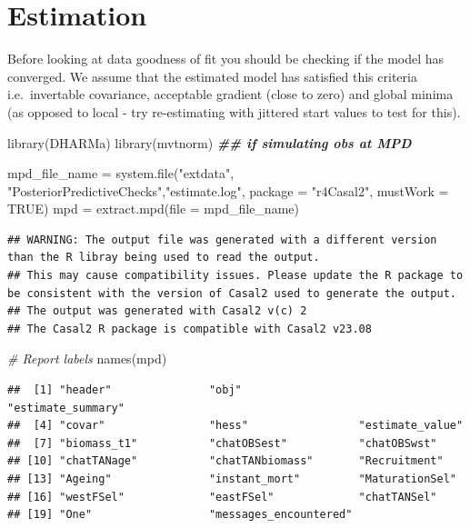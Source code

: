 \documentclass[
]{book}
\newenvironment{Shaded}{\begin{snugshade}}{\end{snugshade}}
\newcommand{\AttributeTok}[1]{\textcolor[rgb]{0.77,0.63,0.00}{#1}}
\newcommand{\CommentTok}[1]{\textcolor[rgb]{0.56,0.35,0.01}{\textit{#1}}}
\newcommand{\ConstantTok}[1]{\textcolor[rgb]{0.00,0.00,0.00}{#1}}
\newcommand{\DocumentationTok}[1]{\textcolor[rgb]{0.56,0.35,0.01}{\textbf{\textit{#1}}}}
\newcommand{\FunctionTok}[1]{\textcolor[rgb]{0.00,0.00,0.00}{#1}}
\newcommand{\NormalTok}[1]{#1}
\newcommand{\OtherTok}[1]{\textcolor[rgb]{0.56,0.35,0.01}{#1}}
\newcommand{\StringTok}[1]{\textcolor[rgb]{0.31,0.60,0.02}{#1}}
\begin{document}
\hypertarget{estimation}{%
\section{Estimation}\label{estimation}}

Before looking at data goodness of fit you should be checking if the model has converged. We assume that the estimated model has satisfied this criteria i.e.~invertable covariance, acceptable gradient (close to zero) and global minima (as opposed to local - try re-estimating with jittered start values to test for this).

\begin{Shaded}
\begin{Highlighting}[]
\FunctionTok{library}\NormalTok{(DHARMa)}
\FunctionTok{library}\NormalTok{(mvtnorm) }\DocumentationTok{\#\# if simulating obs at MPD}

\NormalTok{mpd\_file\_name }\OtherTok{=} \FunctionTok{system.file}\NormalTok{(}\StringTok{"extdata"}\NormalTok{, }\StringTok{"PosteriorPredictiveChecks"}\NormalTok{,}\StringTok{"estimate.log"}\NormalTok{, }
                            \AttributeTok{package =} \StringTok{"r4Casal2"}\NormalTok{, }\AttributeTok{mustWork =} \ConstantTok{TRUE}\NormalTok{)}
\NormalTok{mpd }\OtherTok{=} \FunctionTok{extract.mpd}\NormalTok{(}\AttributeTok{file =}\NormalTok{ mpd\_file\_name)}
\end{Highlighting}
\end{Shaded}

\begin{verbatim}
## WARNING: The output file was generated with a different version than the R libray being used to read the output.
## This may cause compatibility issues. Please update the R package to be consistent with the version of Casal2 used to generate the output.
## The output was generated with Casal2 v(c) 2
## The Casal2 R package is compatible with Casal2 v23.08
\end{verbatim}

\begin{Shaded}
\begin{Highlighting}[]
\CommentTok{\# Report labels}
\FunctionTok{names}\NormalTok{(mpd)}
\end{Highlighting}
\end{Shaded}

\begin{verbatim}
##  [1] "header"               "obj"                  "estimate_summary"    
##  [4] "covar"                "hess"                 "estimate_value"      
##  [7] "biomass_t1"           "chatOBSest"           "chatOBSwst"          
## [10] "chatTANage"           "chatTANbiomass"       "Recruitment"         
## [13] "Ageing"               "instant_mort"         "MaturationSel"       
## [16] "westFSel"             "eastFSel"             "chatTANSel"          
## [19] "One"                  "messages_encountered"
\end{verbatim}
\end{document}
